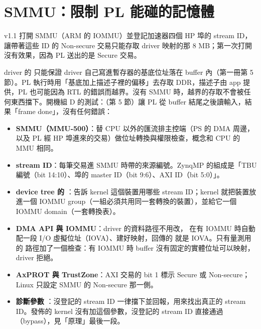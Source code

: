 \section{SMMU：限制 PL 能碰的記憶體}
\label{sec:smmu}

\begin{oneline}
v1.1 打開 SMMU（ARM 的 IOMMU）並登記加速器四個 HP 埠的 stream ID，讓帶著這些 ID 的 Non-secure 交易只能存取 driver 映射的那 8 MB；第一次打開沒有效果，因為 PL 送出的是 Secure 交易。
\end{oneline}

\begin{before}
driver 的  只能保證 driver 自己寫進暫存器的基底位址落在 buffer 內（第一冊第 5 節）。PL 執行時用「基底加上描述子裡的偏移」去存取 DDR，描述子由 app 提供，PL 也可能因為 RTL 的錯誤而越界。沒有 SMMU 時，越界的存取不會被任何東西擋下。開機組 D 的測試：（第 5 節）讓 PL 從 buffer 結尾之後讀輸入，結果「frame done」，沒有任何錯誤：

\end{before}

\begin{tech}
\begin{itemize}
\item \textbf{SMMU（MMU-500）}：替 CPU 以外的匯流排主控端（PS 的 DMA 周邊，以及 PL 經 HP 埠進來的交易）做位址轉換與權限檢查，概念和 CPU 的 MMU 相同。
\item \textbf{stream ID}：每筆交易進 SMMU 時帶的來源編號。ZynqMP 的組成是「TBU 編號（bit 14:10）、埠的 master ID（bit 9:6）、AXI ID（bit 5:0）」。
\item \textbf{device tree 的 }：告訴 kernel 這個裝置用哪些 stream ID；kernel 就把裝置放進一個 IOMMU group（一組必須共用同一套轉換的裝置），並給它一個 IOMMU domain（一套轉換表）。
\item \textbf{DMA API 與 IOMMU}：driver 的資料路徑不用改， 在有 IOMMU 時自動配一段 I/O 虛擬位址（IOVA）、建好映射，回傳的  就是 IOVA。只有量測用的  路徑加了一個檢查：有 IOMMU 時 buffer 沒有固定的實體位址可以映射，driver 拒絕。
\item \textbf{AxPROT 與 TrustZone}：AXI 交易的 bit 1 標示 Secure 或 Non-secure；Linux 只設定 SMMU 的 Non-secure 那一側。
\item \textbf{診斷參數 }：沒登記的 stream ID 一律擋下並回報，用來找出真正的 stream ID。發佈的 kernel 沒有加這個參數，沒登記的 stream ID 直接通過（bypass），見「原理」最後一段。
\end{itemize}
\end{tech}

